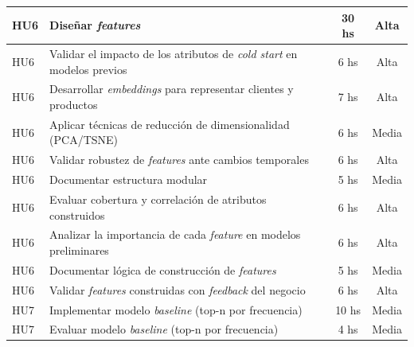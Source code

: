 \documentclass[
11pt, %
]{charter}
\begin{document}
\begin{longtable}{|p{2cm}|p{9cm}|c|c|}
HU6 & Diseñar \textit{features} & 30 hs & Alta \\ \hline
HU6 & Validar el impacto de los atributos de \textit{cold start} en modelos previos & 6 hs & Alta \\ \hline
HU6 & Desarrollar \textit{embeddings} para representar clientes y productos & 7 hs & Alta \\ \hline
HU6 & Aplicar técnicas de reducción de dimensionalidad (PCA/TSNE) & 6 hs & Media \\ \hline
HU6 & Validar robustez de \textit{features} ante cambios temporales & 6 hs & Alta \\ \hline
HU6 & Documentar estructura modular & 5 hs & Media \\ \hline
HU6 & Evaluar cobertura y correlación de atributos construidos & 6 hs & Alta \\ \hline
HU6 & Analizar la importancia de cada \textit{feature} en modelos preliminares & 6 hs & Alta \\ \hline
HU6 & Documentar lógica de construcción de \textit{features} & 5 hs & Media \\ \hline
HU6 & Validar \textit{features} construidas con \textit{feedback} del negocio & 6 hs & Alta \\ \hline

HU7 & Implementar modelo \textit{baseline} (top-n por frecuencia) & 10 hs & Media \\ \hline
HU7 & Evaluar modelo \textit{baseline} (top-n por frecuencia) & 4 hs & Media \\ \hline


\end{longtable}
\end{document}
